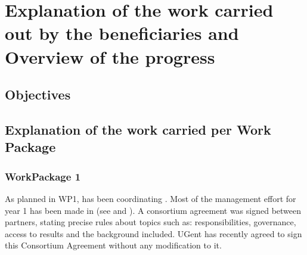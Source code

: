 \documentclass{deliverablereport}
\begin{document}
\enlargethispage{4ex}
\maketitle
\githubissuedescription
\tableofcontents\newpage



\section{Explanation of the work carried out by the beneficiaries and Overview of the progress}


\subsection{Objectives}


\subsection{Explanation of the work carried per Work Package}
\subsubsection{WorkPackage 1}


As planned in WP1,  has been coordinating \ODK.  Most of the
management effort for year 1 has been made in
 (see
 and
).  A consortium agreement was signed
between partners, stating precise rules about topics such as:
responsibilities, governance, access to results and the background
included. UGent has recently agreed to sign this Consortium Agreement
without any modification to it.
\end{document}
